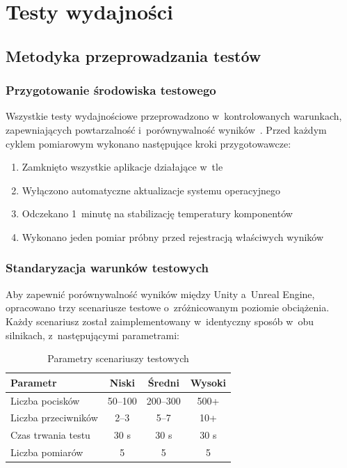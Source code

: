 
\clearpage
\section{Testy wydajności}
\label{sec:testy-wydajnosci}

\subsection{Metodyka przeprowadzania testów}

\subsubsection{Przygotowanie środowiska testowego}

Wszystkie testy wydajnościowe przeprowadzono w~kontrolowanych warunkach, zapewniających powtarzalność i~porównywalność wyników~\cite{petridis2012benchmarking}. Przed każdym cyklem pomiarowym wykonano następujące kroki przygotowawcze:

\begin{enumerate}
    \item Zamknięto wszystkie aplikacje działające w~tle
    \item Wyłączono automatyczne aktualizacje systemu operacyjnego
    \item Odczekano 1~minutę na stabilizację temperatury komponentów
    \item Wykonano jeden pomiar próbny przed rejestracją właściwych wyników
\end{enumerate}

\subsubsection{Standaryzacja warunków testowych}

Aby zapewnić porównywalność wyników między Unity a~Unreal Engine, opracowano trzy scenariusze testowe o~zróżnicowanym poziomie obciążenia. Każdy scenariusz został zaimplementowany w~identyczny sposób w~obu silnikach, z~następującymi parametrami:

\begin{table}[h!]
    \centering
    \caption{Parametry scenariuszy testowych}
    \label{tab:test-scenarios}
    \begin{tabular}{|l|c|c|c|}
        \hline
        \textbf{Parametr} & \textbf{Niski} & \textbf{Średni} & \textbf{Wysoki} \\
        \hline\hline
        Liczba pocisków & 50--100 & 200--300 & 500+ \\
        \hline
        Liczba przeciwników & 2--3 & 5--7 & 10+ \\
        \hline
        Czas trwania testu & 30 s & 30 s & 30 s \\
        \hline
        Liczba pomiarów & 5 & 5 & 5 \\
        \hline
    \end{tabular}
\end{table}

